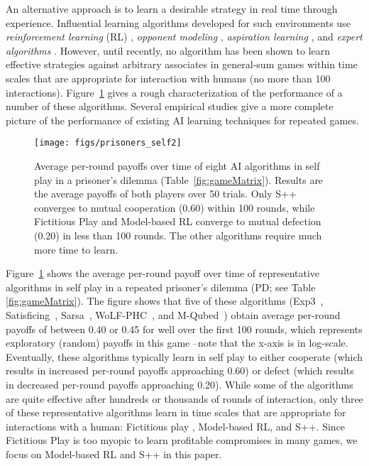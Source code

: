 \documentclass[fleqn,10pt]{SelfArx}
\begin{document}
An alternative approach is to learn a desirable strategy in real time through experience. Influential learning algorithms developed for such environments use \emph{reinforcement learning} (RL) \cite{watkinsphd,MinimaxQ,friendorfoe,WoLF,CEQ,CrandallGoodrichMLJ2010}, \emph{opponent modeling} \cite{FictitiousPlay,GanzfriedSandholm2011}, \emph{aspiration learning} \cite{Karandikar,StimpsonIJCAI,Chasparis2010}, and \emph{expert algorithms}  \cite{UCB,exextrade,auer95gambling}.  However, until recently, no algorithm has been shown to learn effective strategies against arbitrary associates in general-sum games within time scales that are appropriate for interaction with humans (no more than 100 interactions).  Figure~\ref{fig:speedtest} gives a rough characterization of the performance of a number of these algorithms.  Several empirical studies  \cite{Frenchies,CrandallGoodrichMLJ2010} give a more complete picture of the performance of existing AI learning techniques for repeated games.  
 
\begin{figure}
\begin{center}
	\texttt{[image: figs/prisoners\_self2]}
	\caption{Average per-round payoffs over time of eight AI algorithms in self play in a prisoner's dilemma (Table~\ref{fig:gameMatrix}).   Results are the average payoffs of both players over 50 trials.  Only S++ converges to mutual cooperation (0.60) within 100 rounds, while Fictitious Play and Model-based RL converge to mutual defection (0.20) in less than 100 rounds.  The other algorithms require much more time to learn.}
\label{fig:speedtest}
\end{center}
\end{figure}

Figure~\ref{fig:speedtest} shows the average per-round payoff over time of representative algorithms in self play in a repeated prisoner's dilemma (PD; see Table \ref{fig:gameMatrix}).  The figure shows that five of these algorithms (Exp3~\cite{auer95gambling}, Satisficing~\cite{StimpsonIJCAI}, Sarsa~\cite{Sarsa1994}, WoLF-PHC~\cite{WoLF}, and M-Qubed~\cite{CrandallGoodrichMLJ2010}) obtain average per-round payoffs of between 0.40 or 0.45 for well over the first 100 rounds, which represents exploratory (random) payoffs in this game --note that the x-axis is in log-scale.  Eventually, these algorithms typically learn in self play to either cooperate (which results in increased per-round payoffs approaching 0.60) or defect (which results in decreased per-round payoffs approaching 0.20).   While some of the algorithms are quite effective after hundreds or thousands of rounds of interaction, only three of these representative algorithms learn in time scales that are appropriate for interactions with a human: Fictitious play \cite{FictitiousPlay}, Model-based RL, and S++.  Since Fictitious Play is too myopic to learn profitable compromises in many games, we focus on Model-based RL and S++ in this paper.
\end{document}

